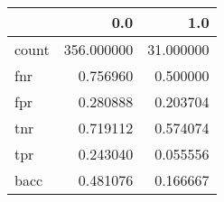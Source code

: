 \begin{tabular}{lrr}
\toprule
{} &         0.0 &        1.0 \\
\midrule
count &  356.000000 &  31.000000 \\
fnr   &    0.756960 &   0.500000 \\
fpr   &    0.280888 &   0.203704 \\
tnr   &    0.719112 &   0.574074 \\
tpr   &    0.243040 &   0.055556 \\
bacc  &    0.481076 &   0.166667 \\
\bottomrule
\end{tabular}
